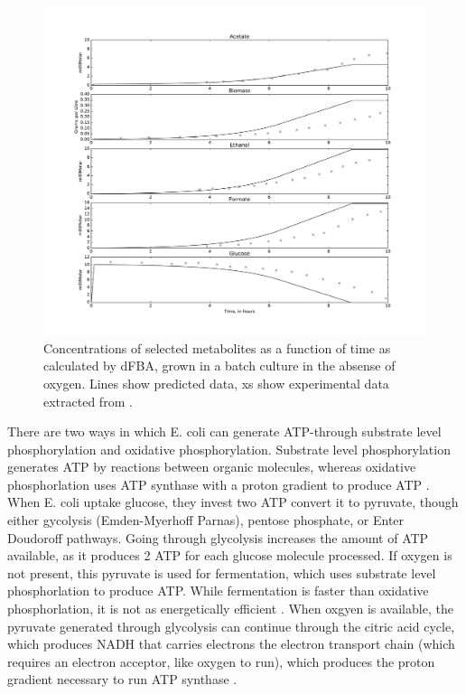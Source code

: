 \documentclass{article}
\begin{document}
\begin{figure}[!htb]
\includegraphics[width=18cm]{../MikesNewNetwork/figures/AttemptToRecreateFig11}
\caption{Concentrations of selected metabolites as a function of time as calculated by dFBA, grown in a batch culture in the absense of oxygen. Lines show predicted data, xs show experimental data extracted from \cite{varma1994stoichiometric}. }
\label{fig:anaerobic}
\end{figure}
There are two ways in which E. coli can generate ATP-through substrate level phosphorylation and oxidative phosphorylation. Substrate level phosphorylation generates ATP by reactions between organic molecules, whereas oxidative phosphorlation uses ATP synthase with a proton gradient to produce ATP \cite{conway2015metabolism}. When E. coli uptake glucose, they invest two ATP convert it to pyruvate, though either gycolysis (Emden-Myerhoff Parnas), pentose phosphate, or Enter Doudoroff pathways. Going through glycolysis increases the amount of ATP available, as it produces 2 ATP for each glucose molecule processed. If oxygen is not present, this pyruvate is used for fermentation, which uses substrate level phosphorlation to produce ATP. While fermentation is faster than oxidative phosphorlation, it is not as energetically efficient \cite{conway2015metabolism}. When oxgyen is available, the pyruvate generated through glycolysis can continue through the citric acid cycle, which produces NADH that carries electrons the electron transport chain (which requires an electron acceptor, like oxygen to run), which produces the proton gradient necessary to run ATP synthase \cite{biobook}. 
\end{document}
